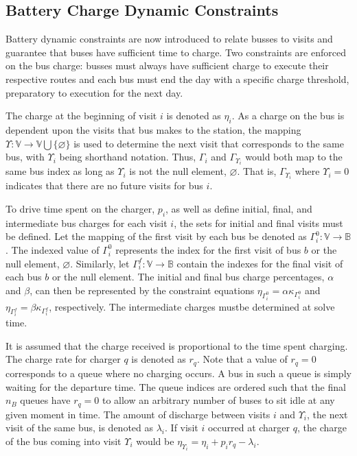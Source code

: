 \documentclass[utf8]{FrontiersinHarvard}
\begin{document}
\subsection{Battery Charge Dynamic Constraints}
\label{sec:batt_dynamics}
Battery dynamic constraints are now introduced to relate busses to visits and guarantee that buses have sufficient time
to charge. Two constraints are enforced on the bus charge: busses must always have sufficient charge to execute their
respective routes and each bus must end the day with a specific charge threshold, preparatory to execution for the next
day.

The charge at the beginning of visit $i$ is denoted as $\eta_i$. As a charge on the bus is dependent upon the visits that
bus makes to the station, the mapping $\Upsilon: \mathbb{V} \rightarrow \mathbb{V} \bigcup \{\varnothing\}$ is used to determine the next visit
that corresponds to the same bus, with $\Upsilon_i$ being shorthand notation. Thus, $\Gamma_i$ and $\Gamma_{\Upsilon_i}$ would both map to the
same bus index as long as $\Upsilon_i$ is not the null element, $\varnothing$. That is, $\Gamma_{\Upsilon_i}$ where $\Upsilon_i = 0$ indicates
that there are no future visits for bus $i$.

To drive time spent on the charger, $p_i$, as well as define initial, final, and intermediate bus charges for each visit
$i$, the sets for initial and final visits must be defined. Let the mapping of the first visit by each bus be denoted as
$\Gamma^0_i : \mathbb{V} \rightarrow \mathbb{B}$. The indexed value of $\Gamma^0_i$ represents the index for the first visit of bus $b$ or
the null element, $\varnothing$. Similarly, let $\Gamma^f_i : \mathbb{V} \rightarrow \mathbb{B}$ contain the indexes for the final
visit of each bus $b$ or the null element. The initial and final bus charge percentages, $\alpha$ and $\beta$, can then be
represented by the constraint equations $\eta_{\Gamma^0_i} = \alpha \kappa_{\Gamma^0_i}$ and \(\eta_{\Gamma^f_i} = \beta \kappa_{\Gamma^f_i}\), respectively. The
intermediate charges mustbe determined at solve time.

It is assumed that the charge received is proportional to the time spent charging. The charge rate for charger $q$ is
denoted as $r_q$. Note that a value of $r_q = 0$ corresponds to a queue where no charging occurs. A bus in such a queue
is simply waiting for the departure time. The queue indices are ordered such that the final $n_B$ queues have $r_q = 0$
to allow an arbitrary number of buses to sit idle at any given moment in time. The amount of discharge between visits
$i$ and $\Upsilon_i$, the next visit of the same bus, is denoted as $\lambda_i$. If visit $i$ occurred at charger $q$, the charge of
the bus coming into visit $\Upsilon_i$ would be $\eta_{\Upsilon_i} = \eta_i + p_i r_q - \lambda_i$.
\end{document}
